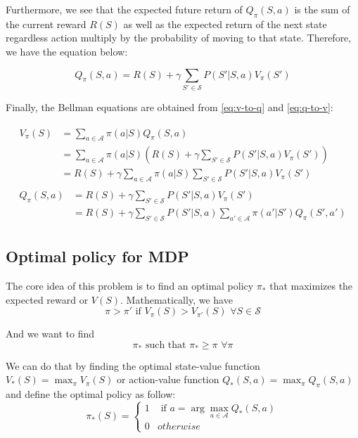 \documentclass[
  a4paper, xcolor = usenames,dvipsnames]{article}
\theoremstyle{definition}
\theoremstyle{definition}
\theoremstyle{definition}
\theoremstyle{definition}
\theoremstyle{remark}
\begin{document}
Furthermore, we see that the expected future return of \(Q_{\pi}(S, a)\) is the sum of the current reward \(R(S)\) as well as the expected return of the next state regardless action multiply by the probability of moving to that state. Therefore, we have the equation below:

\begin{equation}
Q_{\pi}(S, a) = R(S) + \gamma \sum_{S' \in \mathcal{S}} P(S' | S, a) V_{\pi}(S')
\label{eq:q-to-v}
\end{equation}

Finally, the Bellman equations are obtained from \eqref{eq:v-to-q} and \eqref{eq:q-to-v}:

\begin{align}
\begin{split}
V_{\pi}(S) {}&= \sum_{a \in \mathcal{A}} \pi(a | S) Q_{\pi}(S, a) \\
  &= \sum_{a \in \mathcal{A}} \pi(a | S) (R(S) + \gamma \sum_{S' \in \mathcal{S}} P(S' | S, a) V_{\pi}(S')) \\
  &= R(S) + \gamma \sum_{a \in \mathcal{A}} \pi(a | S) \sum_{S' \in \mathcal{S}} P(S' | S, a) V_{\pi}(S')
\label{eq:bellman-v-1}
\end{split} \\
\begin{split}
Q_{\pi}(S, a) {}&= R(S) + \gamma \sum_{S' \in \mathcal{S}} P(S' | S, a) V_{\pi}(S') \\
  &= R(S) + \gamma \sum_{S' \in \mathcal{S}} P(S' | S, a) \sum_{a' \in \mathcal{A}} \pi(a' | S') Q_{\pi}(S', a')
\label{eq:bellman-q-1}
\end{split}
\end{align}

\hypertarget{optimal-policy-for-mdp}{%
\subsection{Optimal policy for MDP}\label{optimal-policy-for-mdp}}

The core idea of this problem is to find an optimal policy \(\pi_{*}\) that maximizes the expected reward or \(V(S)\). Mathematically, we have
\[
\pi > \pi' \text{ if } V_{\pi}(S) > V_{\pi'}(S) \,\, \forall S \in \mathcal{S}
\]

And we want to find
\[
\pi_{*} \text{ such that } \pi_{*} \ge \pi \,\, \forall \pi
\]

We can do that by finding the optimal state-value function \(V_{*}(S) = \max_{\pi} V_{\pi}(S)\) or action-value function \(Q_{*}(S, a) = \max_{\pi} Q_{\pi}(S, a)\) and define the optimal policy as follow:
\[
\pi_{*}(S) = \begin{cases}
1 & \text{ if } a = \arg\max_{a \in \mathcal{A}} Q_{*}(S, a) \\
0 & otherwise
\end{cases}
\]
\end{document}

